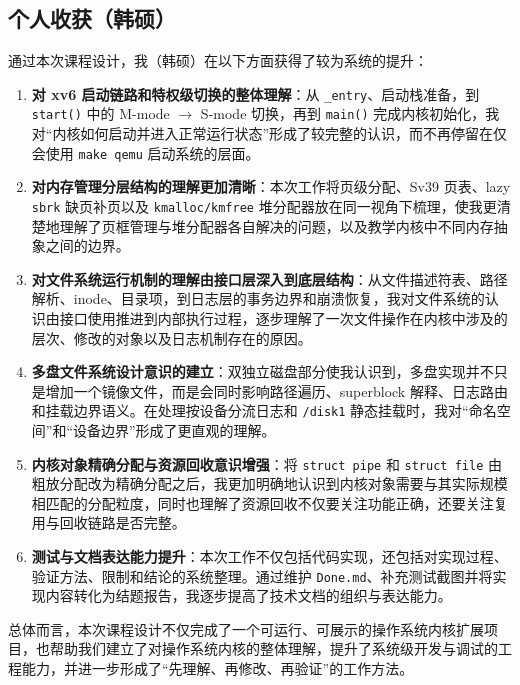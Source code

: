 \documentclass[12pt,a4paper]{ctexart}
\begin{document}
\subsection{个人收获（韩硕）}

通过本次课程设计，我（韩硕）在以下方面获得了较为系统的提升：

\begin{enumerate}
  \item \textbf{对 xv6 启动链路和特权级切换的整体理解}：从 \texttt{\_entry}、启动栈准备，到 \texttt{start()} 中的 M-mode $\rightarrow$ S-mode 切换，再到 \texttt{main()} 完成内核初始化，我对“内核如何启动并进入正常运行状态”形成了较完整的认识，而不再停留在仅会使用 \texttt{make qemu} 启动系统的层面。
  \item \textbf{对内存管理分层结构的理解更加清晰}：本次工作将页级分配、Sv39 页表、lazy \texttt{sbrk} 缺页补页以及 \texttt{kmalloc/kmfree} 堆分配器放在同一视角下梳理，使我更清楚地理解了页框管理与堆分配器各自解决的问题，以及教学内核中不同内存抽象之间的边界。
  \item \textbf{对文件系统运行机制的理解由接口层深入到底层结构}：从文件描述符表、路径解析、inode、目录项，到日志层的事务边界和崩溃恢复，我对文件系统的认识由接口使用推进到内部执行过程，逐步理解了一次文件操作在内核中涉及的层次、修改的对象以及日志机制存在的原因。
  \item \textbf{多盘文件系统设计意识的建立}：双独立磁盘部分使我认识到，多盘实现并不只是增加一个镜像文件，而是会同时影响路径遍历、superblock 解释、日志路由和挂载边界语义。在处理按设备分流日志和 \texttt{/disk1} 静态挂载时，我对“命名空间”和“设备边界”形成了更直观的理解。
  \item \textbf{内核对象精确分配与资源回收意识增强}：将 \texttt{struct pipe} 和 \texttt{struct file} 由粗放分配改为精确分配之后，我更加明确地认识到内核对象需要与其实际规模相匹配的分配粒度，同时也理解了资源回收不仅要关注功能正确，还要关注复用与回收链路是否完整。
  \item \textbf{测试与文档表达能力提升}：本次工作不仅包括代码实现，还包括对实现过程、验证方法、限制和结论的系统整理。通过维护 \texttt{Done.md}、补充测试截图并将实现内容转化为结题报告，我逐步提高了技术文档的组织与表达能力。
\end{enumerate}

总体而言，本次课程设计不仅完成了一个可运行、可展示的操作系统内核扩展项目，也帮助我们建立了对操作系统内核的整体理解，提升了系统级开发与调试的工程能力，并进一步形成了“先理解、再修改、再验证”的工作方法。
\end{document}
